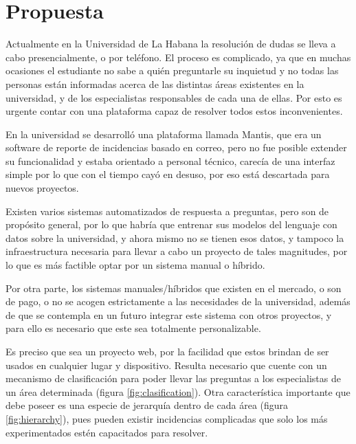 \chapter{Propuesta}\label{chapter:proposal}

Actualmente en la Universidad de La Habana la resolución de dudas se lleva a cabo presencialmente, o por teléfono. El proceso es complicado, ya que en muchas ocasiones el estudiante no sabe a quién preguntarle su inquietud y no todas las personas están informadas acerca de las distintas áreas existentes en la universidad, y de los especialistas responsables de cada una de ellas. Por esto es urgente contar con una plataforma capaz de resolver todos estos inconvenientes.
\newline

En la universidad se desarrolló una plataforma llamada Mantis, que era un software de reporte de incidencias basado en correo, pero no fue posible extender su funcionalidad y estaba orientado a personal técnico, carecía de una interfaz simple por lo que con el tiempo cayó en desuso, por eso está descartada para nuevos proyectos.
\newline

Existen varios sistemas automatizados de respuesta a preguntas, pero son de propósito general, por lo que habría que entrenar sus modelos del lenguaje con datos sobre la universidad, y ahora mismo no se tienen esos datos, y tampoco la infraestructura necesaria para llevar a cabo un proyecto de tales magnitudes, por lo que es más factible optar por un sistema manual o híbrido.
\newline

Por otra parte, los sistemas manuales/híbridos que existen en el mercado, o son de pago, o no se acogen estrictamente a las necesidades de la universidad, además de que se contempla en un futuro integrar este sistema con otros proyectos, y para ello es necesario que este sea totalmente personalizable.
\newline

Es preciso que sea un proyecto web, por la facilidad que estos brindan de ser usados en cualquier lugar y dispositivo. Resulta necesario que cuente con un mecanismo de clasificación para poder llevar las preguntas a los especialistas de un área determinada (figura \ref{fig:clasification}). Otra característica importante que debe poseer es una especie de jerarquía dentro de cada área (figura \ref{fig:hierarchy}), pues pueden existir incidencias complicadas que solo los más experimentados estén capacitados para resolver.
\newline


